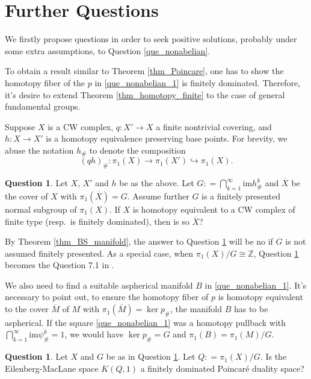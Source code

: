 \documentclass[12pt]{amsart}
\theoremstyle{plain}
\theoremstyle{definition}
\theoremstyle{question}
\newtheorem{question}[theorem]{Question}
\theoremstyle{remark}
\theoremstyle{assumption}
\numberwithin{equation}{section}
\theoremstyle{bigthm}
\begin{document}
\section{Further Questions}\label{sec_question}
We firstly propose questions in order to seek positive solutions, probably under some extra assumptions, to Question \ref{que_nonabelian}.

To obtain a result similar to Theorem \ref{thm_Poincare}, one has to show the homotopy fiber of the $p$ in \eqref{que_nonabelian_1} is finitely dominated. Therefore, it's desire to extend Theorem \ref{thm_homotopy_finite} to the case of general fundamental groups.

Suppose $X$ is a CW complex, $q \colon  X' \rightarrow X$ a finite nontrivial covering, and $h \colon  X \rightarrow X'$ is a homotopy equivalence preserving base points. For brevity, we abuse the notation $h_{\#}$ to denote the composition
\[
(qh)_{\#} \colon  \pi_{1} (X) \rightarrow \pi_{1} (X') \hookrightarrow \pi_{1} (X).
\]
\begin{question}\label{que_homotopy_finite}
Let $X$, $X'$ and $h$ be as the above. Let $G: = \bigcap_{k=1}^{\infty} \mathrm{im} h_{\#}^{k}$ and $\overline{X}$ be the cover of $X$ with $\pi_{1} (\overline{X}) = G$. Assume further $G$ is a finitely presented normal subgroup of $\pi_{1} (X)$. If $X$ is homotopy equivalent to a CW complex of finite type (resp.~is finitely dominated), then is so $\overline{X}$?
\end{question}

By Theorem \ref{thm_BS_manifold}, the answer to Question \ref{que_homotopy_finite} will be no if $G$ is not assumed finitely presented. As a special case, when $\pi_{1} (X) / G \cong \mathbb{Z}$, Question \ref{que_homotopy_finite} becomes the Question 7.1 in \cite{Qin_Su_Wang}.

We also need to find a suitable aspherical manifold $B$ in \eqref{que_nonabelian_1}. It's necessary to point out, to ensure the homotopy fiber of $p$ is homotopy equivalent to the cover $\overline{M}$ of $M$ with $\pi_{1} (\overline{M}) = \ker p_{\#}$, the manifold $B$ has to be aspherical. If the square \eqref{que_nonabelian_1} was a homotopy pullback with $\bigcap_{k=1}^{\infty} \mathrm{im} \psi_{\#}^{k} =1$, we would have $\ker p_{\#} = G$ and $\pi_{1} (B) = \pi_{1} (M) / G$.
\begin{question}\label{que_Poincare}
Let $X$ and $G$ be as in Question \ref{que_homotopy_finite}. Let $Q: = \pi_{1} (X) / G$. Is the Eilenberg-MacLane space $K(Q,1)$ a finitely dominated Poincar\'{e} duality space?
\end{question}
\end{document}
